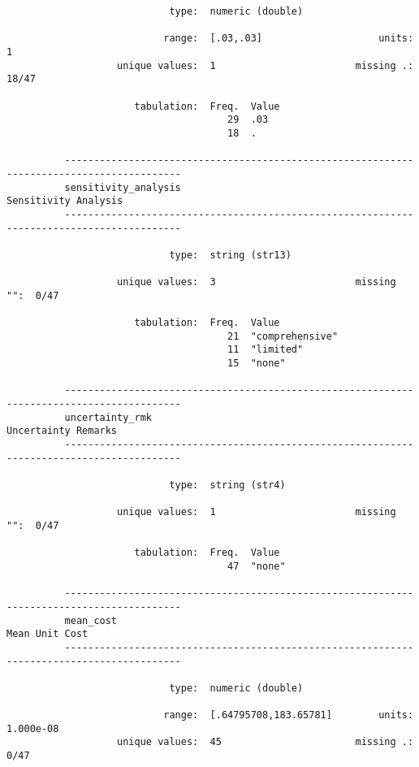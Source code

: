 \documentclass{article}
\begin{document}
\begin{verbatim}
                            type:  numeric (double)
          
                           range:  [.03,.03]                    units:  1
                   unique values:  1                        missing .:  18/47
          
                      tabulation:  Freq.  Value
                                      29  .03
                                      18  .
          
          ------------------------------------------------------------------------------------------
          sensitivity_analysis                                                  Sensitivity Analysis
          ------------------------------------------------------------------------------------------
          
                            type:  string (str13)
          
                   unique values:  3                        missing "":  0/47
          
                      tabulation:  Freq.  Value
                                      21  "comprehensive"
                                      11  "limited"
                                      15  "none"
          
          ------------------------------------------------------------------------------------------
          uncertainty_rmk                                                        Uncertainty Remarks
          ------------------------------------------------------------------------------------------
          
                            type:  string (str4)
          
                   unique values:  1                        missing "":  0/47
          
                      tabulation:  Freq.  Value
                                      47  "none"
          
          ------------------------------------------------------------------------------------------
          mean_cost                                                                   Mean Unit Cost
          ------------------------------------------------------------------------------------------
          
                            type:  numeric (double)
          
                           range:  [.64795708,183.65781]        units:  1.000e-08
                   unique values:  45                       missing .:  0/47
          

\end{verbatim}
\end{document}
